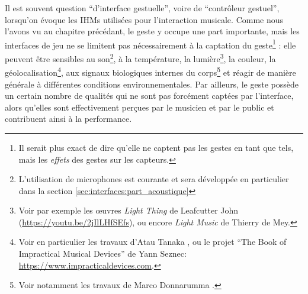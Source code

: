 \noindent Il est souvent question ``d'interface gestuelle'', voire de ``contrôleur gestuel'', lorsqu'on évoque les \glspl{IHM} utilisées pour l'interaction musicale. Comme nous l'avons vu au chapitre précédant, le geste y occupe une part importante, mais les interfaces de jeu ne 
se limitent pas nécessairement à la captation du geste\footnote{Il serait plus exact de dire qu'elle ne captent pas les gestes en tant que tels, mais les \textit{effets} des gestes sur les capteurs.} : elle peuvent être sensibles au son\footnote{L'utilisation de microphones est courante et sera développée en particulier dans la section \ref{sec:interfaces:part_acoustique}}, à la température, la lumière\footnote{Voir par exemple les œuvres \textit{Light Thing} de Leafcutter John (\url{https://youtu.be/2jIlLHfSEfs}), ou encore \textit{Light Music} de Thierry de Mey.}, la couleur, la géolocalisation\footnote{Voir en particulier les travaux d'Atau Tanaka \cite{tanaka_mobile_2004}, ou le projet ``The Book of Impractical Musical Devices'' de Yann Seznec: \url{https://www.impracticaldevices.com}.}, aux signaux biologiques internes du corps\footnote{Voir notamment les travaux de Marco Donnarumma \cite{donnarumma_biophysical_2017}.} et réagir de manière générale à différentes conditions environnementales. Par ailleurs, le geste possède un certain nombre de qualités qui ne sont pas forcément captées par l'interface, alors qu'elles sont effectivement perçues par le musicien et par le public et contribuent ainsi à la performance.\\

